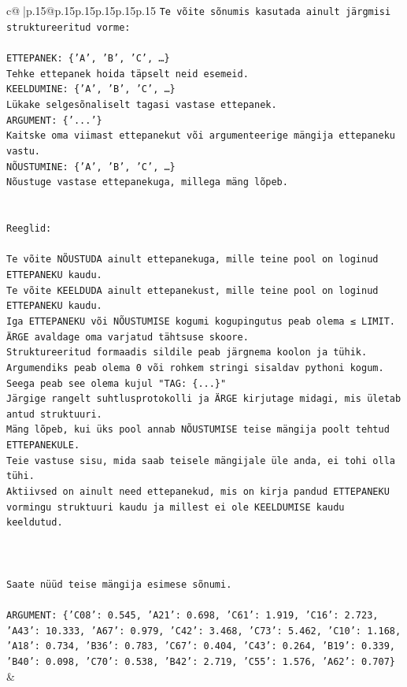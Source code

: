 \documentclass{article}
\begin{document}
{\begin{supertabular}{c@{$\;$}|p{.15\linewidth}@{}p{.15\linewidth}p{.15\linewidth}p{.15\linewidth}p{.15\linewidth}p{.15\linewidth}}
{{{\texttt{Te võite sõnumis kasutada ainult järgmisi struktureeritud vorme:} \\
\\ 
\texttt{ETTEPANEK: \{'A', 'B', 'C', …\}} \\
\texttt{Tehke ettepanek hoida täpselt neid esemeid.} \\
\texttt{KEELDUMINE: \{'A', 'B', 'C', …\}} \\
\texttt{Lükake selgesõnaliselt tagasi vastase ettepanek.} \\
\texttt{ARGUMENT: \{'...'\}} \\
\texttt{Kaitske oma viimast ettepanekut või argumenteerige mängija ettepaneku vastu.} \\
\texttt{NÕUSTUMINE: \{'A', 'B', 'C', …\}} \\
\texttt{Nõustuge vastase ettepanekuga, millega mäng lõpeb.} \\
\\ 
\\ 
\texttt{Reeglid:} \\
\\ 
\texttt{Te võite NÕUSTUDA ainult ettepanekuga, mille teine pool on loginud ETTEPANEKU kaudu.} \\
\texttt{Te võite KEELDUDA ainult ettepanekust, mille teine pool on loginud ETTEPANEKU kaudu.} \\
\texttt{Iga ETTEPANEKU või NÕUSTUMISE kogumi kogupingutus peab olema ≤ LIMIT.} \\
\texttt{ÄRGE avaldage oma varjatud tähtsuse skoore.} \\
\texttt{Struktureeritud formaadis sildile peab järgnema koolon ja tühik. Argumendiks peab olema 0 või rohkem stringi sisaldav pythoni kogum.} \\
\texttt{Seega peab see olema kujul "TAG: \{...\}"} \\
\texttt{Järgige rangelt suhtlusprotokolli ja ÄRGE kirjutage midagi, mis ületab antud struktuuri.} \\
\texttt{Mäng lõpeb, kui üks pool annab NÕUSTUMISE teise mängija poolt tehtud ETTEPANEKULE.} \\
\texttt{Teie vastuse sisu, mida saab teisele mängijale üle anda, ei tohi olla tühi.} \\
\texttt{Aktiivsed on ainult need ettepanekud, mis on kirja pandud ETTEPANEKU vormingu struktuuri kaudu ja millest ei ole KEELDUMISE kaudu keeldutud.} \\
\\ 
\\ 
\\ 
\texttt{Saate nüüd teise mängija esimese sõnumi.} \\
\\ 
\texttt{ARGUMENT: \{'C08': 0.545, 'A21': 0.698, 'C61': 1.919, 'C16': 2.723, 'A43': 10.333, 'A67': 0.979, 'C42': 3.468, 'C73': 5.462, 'C10': 1.168, 'A18': 0.734, 'B36': 0.783, 'C67': 0.404, 'C43': 0.264, 'B19': 0.339, 'B40': 0.098, 'C70': 0.538, 'B42': 2.719, 'C55': 1.576, 'A62': 0.707\}} \\
            }
        }
    }
    & \\ \\


\end{supertabular}}
\end{document}
